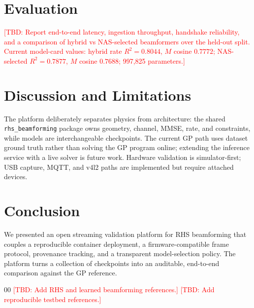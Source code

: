\documentclass[conference]{IEEEtran}
\newcommand{\tbd}[1]{\textcolor{red}{[TBD: #1]}}
\begin{document}
\section{Evaluation}
\tbd{Report end-to-end latency, ingestion throughput, handshake reliability,
and a comparison of hybrid vs NAS-selected beamformers over the held-out split.
Current model-card values: hybrid rate $R^2=0.8044$, $M$ cosine $0.7772$;
NAS-selected $R^2=0.7877$, $M$ cosine $0.7688$; 997{,}825 parameters.}

\section{Discussion and Limitations}
The platform deliberately separates physics from architecture: the shared
\texttt{rhs\_beamforming} package owns geometry, channel, MMSE, rate, and
constraints, while models are interchangeable checkpoints. The current GP path
uses dataset ground truth rather than solving the GP program online; extending
the inference service with a live solver is future work. Hardware validation is
simulator-first; USB capture, MQTT, and v4l2 paths are implemented but require
attached devices.

\section{Conclusion}
We presented an open streaming validation platform for RHS beamforming that
couples a reproducible container deployment, a firmware-compatible frame
protocol, provenance tracking, and a transparent model-selection policy. The
platform turns a collection of checkpoints into an auditable, end-to-end
comparison against the GP reference.

\begin{thebibliography}{00}
 \tbd{Add RHS and learned beamforming references.}
 \tbd{Add reproducible testbed references.}
\end{thebibliography}
\end{document}
